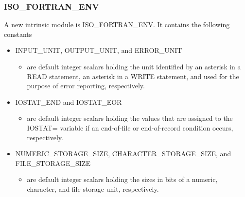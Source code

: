 \documentclass[11pt]{beamer}
\begin{document}

\begin{frame}[fragile]
\frametitle{ISO\_FORTRAN\_ENV}

\footnotesize{
A new intrinsic module is ISO\_FORTRAN\_ENV. It contains the following constants
\begin{itemize}

 \item INPUT\_UNIT, OUTPUT\_UNIT, and ERROR\_UNIT 
  \begin{itemize}
  \item are default integer scalars holding the unit identified by an asterisk in a READ statement, an asterisk in a WRITE statement, and used for the purpose of error reporting, respectively.
  \end{itemize}
  
  \item IOSTAT\_END and IOSTAT\_EOR 
  \begin{itemize}
  \item are default integer scalars holding the values that are assigned to the IOSTAT= variable if an end-of-file or end-of-record condition occurs, respectively.
  \end{itemize}
  
  \item NUMERIC\_STORAGE\_SIZE, CHARACTER\_STORAGE\_SIZE, and FILE\_STORAGE\_SIZE 
  \begin{itemize}
   \item are default integer scalars holding the sizes in bits of a numeric, character, and file storage unit, respectively.
   \end{itemize}
   
\end{itemize}

}

\end{frame}


\end{document}
